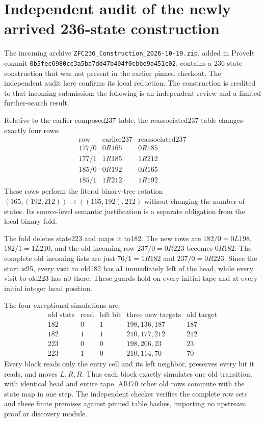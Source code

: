 \section{Independent audit of the newly arrived 236-state construction}

The incoming archive \texttt{ZFC236\_Construction\_2026-10-19.zip}, added in
ProveIt commit \texttt{0b5fec6980cc3a5ba7dd47b404f0cbbe9a451c02}, contains a
236-state construction that was not present in the earlier pinned checkout.
The independent audit here confirms its local reduction. The construction is
credited to that incoming submission; the following is an independent review
and a limited further-search result.

Relative to the earlier composed237 table, the reassociated237 table changes
exactly four rows:
\[
\begin{array}{c|cc}
\text{row}&\text{earlier237}&\text{reassociated237}\\\hline
177/0&0R165&0R185\\
177/1&1R185&1R212\\
185/0&0R192&0R165\\
185/1&1R212&1R192
\end{array}
\]
These rows perform the literal binary-tree rotation
$(165,(192,212))\mapsto((165,192),212)$ without changing the number of states.
Its source-level semantic justification is a separate obligation from the
local binary fold.

The fold deletes state223 and maps it to182. The new rows are
$182/0=0L198$, $182/1=1L210$, and the old incoming row $237/0=0R223$ becomes
$0R182$. The complete old incoming lists are just $76/1=1R182$ and
$237/0=0R223$. Since the start is95, every visit to old182 has a1 immediately
left of the head, while every visit to old223 has a0 there. These guards hold
on every initial tape and at every initial integer head position.

The four exceptional simulations are:
\[
\begin{array}{c|cc|c|c}
\text{old state}&\text{read}&\text{left bit}&
\text{three new targets}&\text{old target}\\\hline
182&0&1&198,136,187&187\\
182&1&1&210,177,212&212\\
223&0&0&198,206,23&23\\
223&1&0&210,114,70&70
\end{array}
\]
Every block reads only the entry cell and its left neighbor, preserves every
bit it reads, and moves $L,R,R$. Thus each block exactly simulates one old
transition, with identical head and entire tape. All470 other old rows commute
with the state map in one step. The independent checker verifies the complete
row sets and these finite premises against pinned table hashes, importing no
upstream proof or discovery module.

